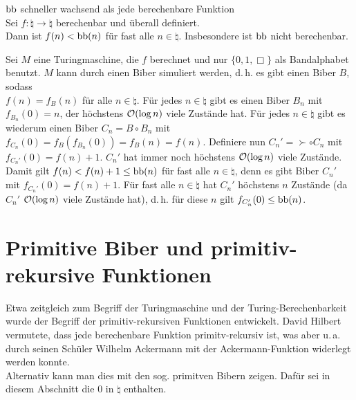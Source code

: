 \begin{Satz}{$\text{bb}$ schneller wachsend als jede berechenbare Funktion}\\
    Sei $f\colon \natural \rightarrow \natural$ berechenbar und überall definiert.\\
    Dann ist $f(n) < \text{bb}(n)$ für fast alle $n \in \natural$.
    Insbesondere ist $\text{bb}$ nicht berechenbar.
\end{Satz}

\begin{Beweis}
    Sei $M$ eine Turingmaschine, die $f$ berechnet und nur $\{0, 1, \Box\}$ als
    Bandalphabet benutzt.
    $M$ kann durch einen Biber simuliert werden, d.\,h. es gibt einen Biber $B$, sodass\\
    $f(n) = f_B(n)$ für alle $n \in \natural$.
    Für jedes $n \in \natural$ gibt es einen Biber $B_n$ mit $f_{B_n}(0) = n$,
    der höchstens $\mathcal{O}(\log n)$ viele Zustände hat.
    Für jedes $n \in \natural$ gibt es wiederum einen Biber
    $C_n = B \circ B_n$ mit $f_{C_n}(0) = f_B(f_{B_n}(0)) = f_B(n) = f(n)$.
    Definiere nun $C_n' = \succ \circ C_n$ mit $f_{C_n'}(0) = f(n) + 1$.
    $C_n'$ hat immer noch höchstens $\mathcal{O}(\log n)$ viele Zustände.\\
    Damit gilt $f(n) < f(n) + 1 \le \text{bb}(n)$ für fast alle $n \in \natural$,
    denn es gibt Biber $C_n'$ mit $f_{C_n'}(0) = f(n) + 1$.
    Für fast alle $n \in \natural$ hat $C_n'$ höchstens $n$ Zustände
    (da $C_n'$ $\mathcal{O}(\log n)$ viele Zustände hat), d.\,h.
    für diese $n$ gilt $f_{C_n'}(0) \le \text{bb}(n)$.
\end{Beweis}

\pagebreak

\section{%
    Primitive Biber und primitiv-rekursive Funktionen%
}

\begin{Bem}
    Etwa zeitgleich zum Begriff der Turingmaschine und der Turing-Berechenbarkeit wurde der
    Begriff der primitiv-rekursiven Funktionen entwickelt.
    David Hilbert vermutete, dass jede berechenbare Funktion primitv-rekursiv ist,
    was aber u.\,a. durch seinen Schüler Wilhelm Ackermann mit der Ackermann-Funktion widerlegt
    werden konnte.\\
    Alternativ kann man dies mit den sog. primitven Bibern zeigen.
    Dafür sei in diesem Abschnitt die $0$ in $\natural$ enthalten.
\end{Bem}

